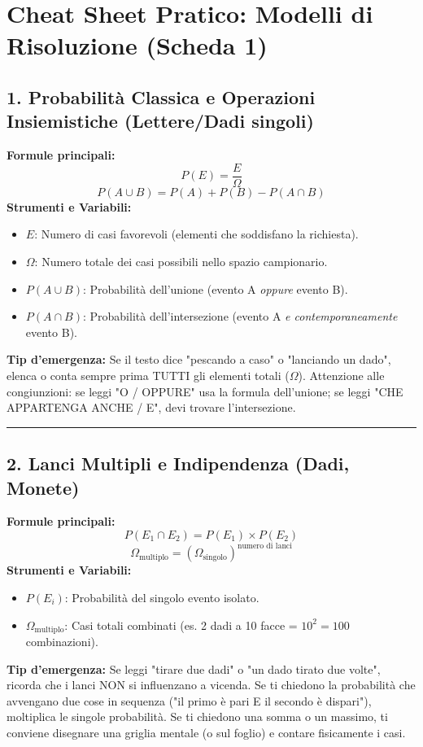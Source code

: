 \documentclass[12pt, a4paper]{article}
\begin{document}
\section*{Cheat Sheet Pratico: Modelli di Risoluzione (Scheda 1)}

\subsection*{1. Probabilità Classica e Operazioni Insiemistiche (Lettere/Dadi singoli)}
\textbf{Formule principali:}
$$ P(E) = \frac{E}{\Omega} $$
$$ P(A \cup B) = P(A) + P(B) - P(A \cap B) $$
\textbf{Strumenti e Variabili:}
\begin{itemize}
    \item $E$: Numero di casi favorevoli (elementi che soddisfano la richiesta).
    \item $\Omega$: Numero totale dei casi possibili nello spazio campionario.
    \item $P(A \cup B)$: Probabilità dell'unione (evento A \textit{oppure} evento B).
    \item $P(A \cap B)$: Probabilità dell'intersezione (evento A \textit{e contemporaneamente} evento B).
\end{itemize}
\textbf{Tip d'emergenza:} Se il testo dice "pescando a caso" o "lanciando un dado", elenca o conta sempre prima TUTTI gli elementi totali ($\Omega$). Attenzione alle congiunzioni: se leggi "O / OPPURE" usa la formula dell'unione; se leggi "CHE APPARTENGA ANCHE / E", devi trovare l'intersezione.

\vspace{0.3cm}\hrule\vspace{0.3cm}

\subsection*{2. Lanci Multipli e Indipendenza (Dadi, Monete)}
\textbf{Formule principali:}
$$ P(E_1 \cap E_2) = P(E_1) \times P(E_2) $$
$$ \Omega_{\text{multiplo}} = (\Omega_{\text{singolo}})^{\text{numero di lanci}} $$
\textbf{Strumenti e Variabili:}
\begin{itemize}
    \item $P(E_i)$: Probabilità del singolo evento isolato.
    \item $\Omega_{\text{multiplo}}$: Casi totali combinati (es. 2 dadi a 10 facce = $10^2 = 100$ combinazioni).
\end{itemize}
\textbf{Tip d'emergenza:} Se leggi "tirare due dadi" o "un dado tirato due volte", ricorda che i lanci NON si influenzano a vicenda. Se ti chiedono la probabilità che avvengano due cose in sequenza ("il primo è pari E il secondo è dispari"), moltiplica le singole probabilità. Se ti chiedono una somma o un massimo, ti conviene disegnare una griglia mentale (o sul foglio) e contare fisicamente i casi.
\end{document}
